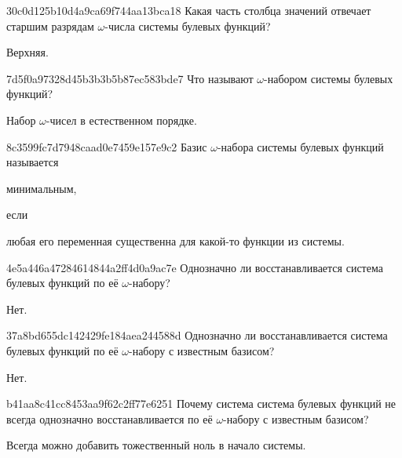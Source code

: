 \begin{note}{30c0d125b10d4a9ca69f744aa13bca18}
    Какая часть столбца значений отвечает старшим разрядам \({ \omega }\)-числа системы булевых функций?

    \begin{cloze}{1}
        Верхняя.
    \end{cloze}
\end{note}

\begin{note}{7d5f0a97328d45b3b3b5b87ec583bde7}
    Что называют \({ \omega }\)-набором системы булевых функций?

    \begin{cloze}{1}
        Набор \({ \omega }\)-чисел в естественном порядке.
    \end{cloze}
\end{note}

\begin{note}{8c3599fc7d7948caad0e7459e157e9c2}
    Базис \({ \omega }\)-набора системы булевых функций называется \begin{icloze}{2}минимальным,\end{icloze} если \begin{icloze}{1}любая его переменная существенна для какой-то функции из системы.\end{icloze}
\end{note}

\begin{note}{4e5a446a47284614844a2ff4d0a9ac7e}
    Однозначно ли восстанавливается система булевых функций по её \({ \omega }\)-набору?

    \begin{cloze}{1}
        Нет.
    \end{cloze}
\end{note}

\begin{note}{37a8bd655dc142429fe184aea244588d}
    Однозначно ли восстанавливается система булевых функций по её \({ \omega }\)-набору с известным базисом?

    \begin{cloze}{1}
        Нет.
    \end{cloze}
\end{note}

\begin{note}{b41aa8c41cc8453aa9f62c2ff77e6251}
    Почему система система булевых функций не всегда однозначно восстанавливается по её \({ \omega }\)-набору с известным базисом?

    \begin{cloze}{1}
        Всегда можно добавить тожественный ноль в начало системы.
    \end{cloze}
\end{note}

